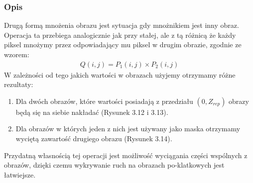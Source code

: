 \documentclass[a4paper,12pt]{book}
\begin{document}
\subsubsection*{Opis}
Drugą formą mnożenia obrazu jest sytuacja gdy mnożnikiem jest inny obraz. Operacja ta przebiega analogicznie jak przy stałej, ale z tą różnicą że każdy piksel mnożymy przez odpowiadający mu piksel w drugim obrazie, zgodnie ze wzorem: 
\begin{gather}
	Q(i,j) = P_1(i,j) \times P_2(i,j)
\end{gather}
W zależności od tego jakich wartości w obrazach użyjemy otrzymamy różne rezultaty: 
\begin{enumerate}
	\item Dla dwóch obrazów, które wartości posiadają z przedziału $(0, Z_{rep})$ obrazy będą się na siebie nakładać (Rysunek 3.12 i 3.13). 
	\item Dla obrazów w których jeden z nich jest używany jako maska otrzymamy wyciętą zawartość drugiego obrazu (Rysunek 3.14). 
\end{enumerate}
Przydatną własnością tej operacji jest możliwość wyciągania części wspólnych z obrazów, dzięki czemu wykrywanie ruch na obrazach po-klatkowych jest łatwiejsze. 
\end{document}
